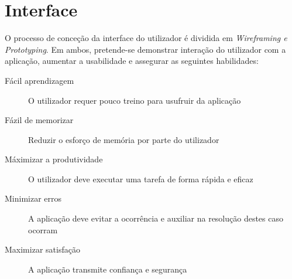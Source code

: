 \chapter[Interface]
{Interface}

O processo de conceção da interface do utilizador é dividida em \emph{Wireframing e Prototyping}. Em ambos, pretende-se demonstrar interação do utilizador com a aplicação, aumentar a usabilidade e assegurar as seguintes habilidades:
\begin{description}
	\item[Fácil aprendizagem] O utilizador requer pouco treino para usufruir da aplicação
	\item[Fázil de memorizar] Reduzir o esforço de memória por parte do utilizador
	\item[Máximizar a produtividade] O utilizador deve executar uma tarefa de forma rápida e eficaz
	\item[Minimizar erros] A aplicação deve evitar a ocorrência e auxiliar na resolução destes caso ocorram
	\item[Maximizar satisfação] A aplicação transmite confiança e segurança
\end{description}


